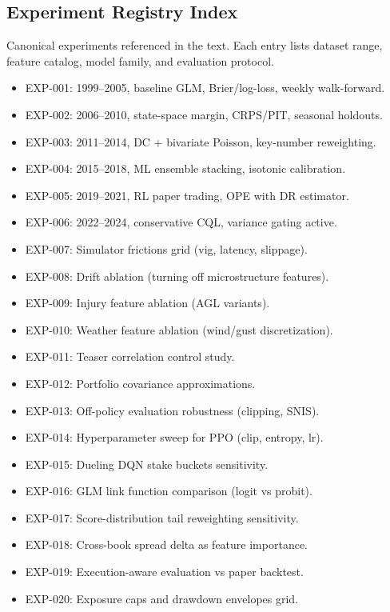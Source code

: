 \subsection{Experiment Registry Index}
Canonical experiments referenced in the text. Each entry lists dataset range, feature catalog, model family, and evaluation protocol.
\begin{itemize}
  \item EXP-001: 1999--2005, baseline GLM, Brier/log-loss, weekly walk-forward.
  \item EXP-002: 2006--2010, state-space margin, CRPS/PIT, seasonal holdouts.
  \item EXP-003: 2011--2014, DC + bivariate Poisson, key-number reweighting.
  \item EXP-004: 2015--2018, ML ensemble stacking, isotonic calibration.
  \item EXP-005: 2019--2021, RL paper trading, OPE with DR estimator.
  \item EXP-006: 2022--2024, conservative CQL, variance gating active.
  \item EXP-007: Simulator frictions grid (vig, latency, slippage).
  \item EXP-008: Drift ablation (turning off microstructure features).
  \item EXP-009: Injury feature ablation (AGL variants).
  \item EXP-010: Weather feature ablation (wind/gust discretization).
  \item EXP-011: Teaser correlation control study.
  \item EXP-012: Portfolio covariance approximations.
  \item EXP-013: Off-policy evaluation robustness (clipping, SNIS).
  \item EXP-014: Hyperparameter sweep for PPO (clip, entropy, lr).
  \item EXP-015: Dueling DQN stake buckets sensitivity.
  \item EXP-016: GLM link function comparison (logit vs probit).
  \item EXP-017: Score-distribution tail reweighting sensitivity.
  \item EXP-018: Cross-book spread delta as feature importance.
  \item EXP-019: Execution-aware evaluation vs paper backtest.
  \item EXP-020: Exposure caps and drawdown envelopes grid.
\end{itemize}

